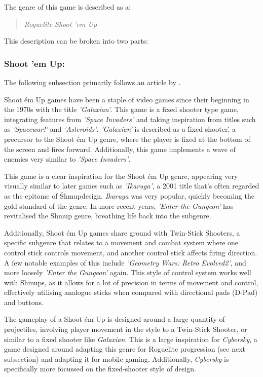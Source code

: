 \documentclass{scrartcl}
\let\cite\textcite
\begin{document}
The genre of this game is described as a:

\begin{quote}
  \emph{Roguelite Shoot 'em Up}
\end{quote}

This description can be broken into two parts:

\subsubsection{Shoot 'em Up:}

The following subsection primarily follows an article by \cite{BrianW2020-01}.

Shoot \'em Up games have been a staple of video games since their beginning in the 1970s with the title \emph{'Galaxian'}. This game is a fixed shooter type game, integrating features from \emph{'Space Invaders'} and taking inspiration from titles such as \emph{'Spacewar!'} and \emph{'Asteroids'}. \emph{'Galaxian'} is described as a \'fixed shooter\', a precursor to the Shoot \'em Up genre, where the player is fixed at the bottom of the screen and fires forward. Additionally, this game implements a wave of enemies very similar to \emph{'Space Invaders'}.

This game is a clear inspiration for the Shoot \'em Up genre, appearing very visually similar to later games such as \emph{'Ikaruga'}, a 2001 title that's often regarded as the epitome of \'Shmup\' design. \emph{Ikaruga} was very popular, quickly becoming the gold standard of the genre. In more recent years, \emph{'Enter the Gungeon'} has revitalised the Shmup genre, breathing life back into the subgenre.

Additionally, Shoot \'em Up games share ground with Twin-Stick Shooters, a specific subgenre that relates to a movement and combat system where one control stick controls movement, and another control stick affects firing direction. A few notable examples of this include \emph{'Geometry Wars: Retro Evolved2'}, and more loosely \emph{'Enter the Gungeon'} again. This style of control system works well with Shmups, as it allows for a lot of precision in terms of movement and control, effectively utilising analogue sticks when compared with directional pads (D-Pad) and buttons.

The gameplay of a Shoot \'em Up is designed around a large quantity of projectiles, involving player movement in the style to a Twin-Stick Shooter, or similar to a fixed shooter like \emph{Galaxian}. This is a large inspiration for \emph{Cybersky}, a game designed around adapting this genre for Roguelite progression (see next subsection) and adapting it for mobile gaming. Additionally, \emph{Cybersky} is specifically more focussed on the fixed-shooter style of design.
\end{document}
